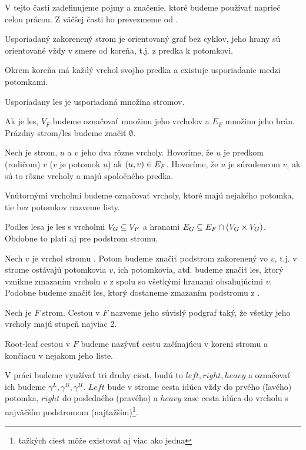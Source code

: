 V tejto časti zadefinujeme pojmy a značenie, ktoré budeme používať naprieč celou prácou.
Z väčšej časti ho prevezmeme od \citet{RTED}.

\begin{definice}\label{def:strom}
  Usporiadaný zakorenený strom je orientovaný graf bez cyklov,
  jeho hrany sú orientované vždy v smere od koreňa, t.j. z predka k potomkovi.

  Okrem koreňa má každý vrchol svojho predka a existuje usporiadanie medzi potomkami.

  Usporiadany les je usporiadaná množina stromov.
\end{definice}

Ak  je les, $V_F$ budeme označovať množinu jeho vrcholov a $E_F$ množinu jeho hrán.
Prázdny strom/les budeme značiť $\emptyset$.

\begin{definice}
  \label{def:stromove_pojmy}
  Nech  je strom, $u$ a $v$ jeho dva rôzne vrcholy.
  Hovoríme, že $u$ je predkom (rodičom) $v$ ($v$ je potomok $u$) ak $(u, v) \in E_{F}$.
  Hovoríme, že $u$ je súrodencom $v$, ak sú to rôzne vrcholy a majú spoločného predka.
\end{definice}

Vnútornými vrcholmi budeme označovať vrcholy, ktoré majú nejakého potomka,
tie bez potomkov nazveme listy.

Podles lesa  je les  s vrcholmi $V_{G} \subseteq V_{F}$
a hranami $E_{G} \subseteq E_{F} \cap (V_{G} \times V_{G})$.
Obdobne to plati aj pre podstrom stromu.

Nech $v$ je vrchol stromu . Potom  budeme značiť podstrom  zakorenený vo $v$,
t.j. v strome ostávajú potomkovia $v$, ich potomkovia, atď.
 budeme značiť les, ktorý vznikne zmazaním vrcholu $v$ z  spolu so
všetkými hranami obsahujúcimi $v$. Podobne  budeme značiť les, ktorý
dostaneme zmazaním podstromu  z .

\begin{definice}
  Nech je $F$ strom. Cestou v $F$ nazveme jeho súvislý podgraf taký, že všetky jeho vrcholy
  majú stupeň najviac 2.

  Root-leaf cestou v $F$ budeme nazývať cestu začínajúcu v koreni stromu a \mbox{končiacu}
  v nejakom jeho liste.
\end{definice}

V práci budeme využívať tri druhy ciest, budú to $left, right, heavy$ a označovať ich
budeme $\gamma^L, \gamma^R, \gamma^H$. $Left$ bude v strome cesta idúca vždy do prvého (ľavého)
potomka, $right$ do posledného (pravého) a $heavy$ zase cesta idúca do vrcholu s najväčším
podstromom (najťažším)\footnote{ťažkých ciest môže existovať aj viac ako jedna}.

